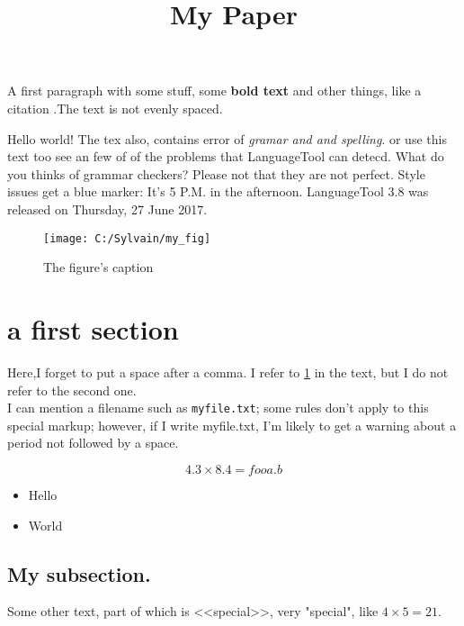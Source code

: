 \documentclass{article}
\begin{document}
\title{My Paper}
\maketitle

A first paragraph with some stuff, some \textbf{bold text}   and other things, like a citation\cite{my:paper} .The text is  not evenly spaced.

Hello world! The tex also, contains error of \emph{gramar and and spelling}. or use this text too see an few of of the problems that LanguageTool can detecd. What do you thinks of grammar checkers? Please not that they are not perfect. Style issues get a blue marker: It's 5 P.M. in the afternoon. LanguageTool 3.8 was released on Thursday, 27 June 2017.

\begin{figure}
\texttt{[image: C:/Sylvain/my\_fig]}
\caption{The figure's caption}
\label{fig:thisfig1}
\end{figure}

\section{a first section}

Here,I forget to put a space after a comma. I refer to \ref{fig:thisfig1} in the text, but I do not refer to the second one. \\
I can mention a filename such as \verb+myfile.txt+; some rules don't apply to this special markup; however, if I write myfile.txt, I'm likely to get a warning about a period not followed by a space.

\begin{equation*}
4.3 \times 8.4 = foo a.b
\end{equation*}

\begin{itemize}
\item Hello %
\item   World
\end{itemize}

\subsection{ My subsection. }

Some other text, part of which is <<special>>, very "special", like $4 \times 5 = 21$.

\end{document}
